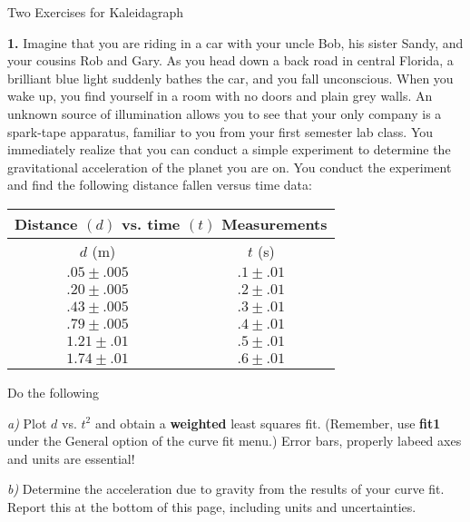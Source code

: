 \pagestyle{empty}


\thispagestyle{empty}
\begin{center}
{\large Two Exercises for Kaleidagraph}
\end{center}

\noindent
{\bf 1.} Imagine that you are riding in a car with your uncle Bob, his sister 
Sandy, and your cousins Rob and Gary. As you head down a back road in 
central Florida, a brilliant blue light suddenly bathes the car, and you
fall unconscious. When you wake up, you find yourself in a room with no 
doors and plain grey walls. An unknown source of illumination allows you
to see that your only company is a spark-tape apparatus, familiar to you
from your first semester lab class. You immediately realize that you can
conduct a simple experiment to determine the gravitational acceleration of 
the planet you are on. You conduct the experiment and find the following
distance fallen versus time data:

\vspace*{0.5cm}
\begin{center}
\begin{tabular}{|c|c|}
\hline
\multicolumn{2}{|c|}{Distance $(d)$ vs. time $(t)$ Measurements} \\
\hline\hline
$d$ (m) & $t$ (s) \\
\hline
  $.05 \pm .005$      &   $.1 \pm .01$   \\
\hline    
  $.20 \pm .005$      &   $.2 \pm .01$   \\
\hline
  $.43 \pm .005$     &   $.3 \pm .01$   \\
\hline
  $.79 \pm .005$     &  $.4 \pm .01$    \\
\hline
  $1.21 \pm .01$     &  $.5 \pm .01$    \\
\hline
  $1.74 \pm .01$      & $.6 \pm .01$     \\
\hline
\end{tabular}
\end{center}

\vspace*{0.5cm}
\noindent
Do the following

{\it a)} Plot $d$ vs. $t^2$ and obtain a {\bf weighted} least squares fit.
(Remember, use {\bf fit1} under the General option of the curve fit menu.)
Error bars, properly labeed axes and units are essential!

\vspace*{0.5cm}
{\it b)} Determine the acceleration due to gravity from the results of 
your curve fit.  Report this at the bottom of this page, including
units and uncertainties.

